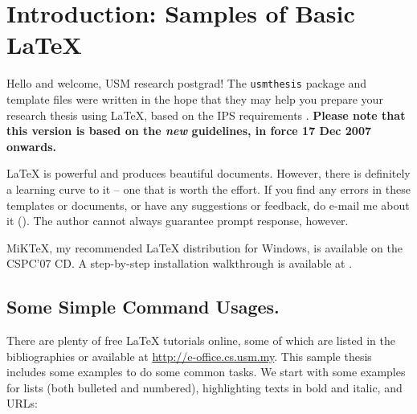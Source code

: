 \chapter{Introduction: Samples of Basic \LaTeX{}}\label{chap:intro}

Hello and welcome, \ac{USM} research postgrad!  The \verb|usmthesis| package and template files were written in the hope that they may help you prepare your research thesis using \LaTeX, based on the \ac{IPS} requirements \citep{ips:thesis:guideline:2007}. \textbf{Please note that this version is based on the \emph{new} guidelines, in force 17 Dec 2007 onwards.}

\LaTeX{} is powerful and produces beautiful documents.  However, there is definitely a learning curve to it -- one that is worth the effort.  %
If you find any errors in these templates or documents, or have any suggestions or feedback, do e-mail me about it ().  The author cannot always guarantee prompt response, however. \Smiley

MiK\TeX{}, my recommended \LaTeX{} distribution for Windows, is available on the CSPC'07 CD. A step-by-step installation walkthrough is available at \citep{lim:latextypesetting}.

\section{Some Simple Command Usages.}

There are plenty of free \LaTeX{} tutorials online, some of which are listed in the bibliographies or available at \url{http://e-office.cs.usm.my}.  This sample thesis includes some examples to do some common tasks.  We start with some examples for lists (both bulleted and numbered), highlighting texts in bold and italic, and URLs:


